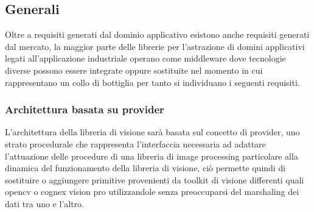 \subsection{Generali}
Oltre a requisiti generati dal dominio applicativo esistono anche requisiti generati dal mercato, la maggior parte delle librerie per l'astrazione di domini applicativi legati all'applicazione industriale operano come middleware dove tecnologie diverse possono essere integrate oppure sostituite nel momento in cui rappresentano un collo di bottiglia per tanto si individuano i seguenti requisiti.

\subsubsection{Architettura basata su provider}
L'architettura della libreria di visione sarà basata sul concetto di provider, uno strato procedurale che rappresenta l'interfaccia necessaria ad adattare l'attuazione delle procedure di una libreria di image processing particolare alla dinamica del funzionamento della libreria di visione, ciò permette quindi di sostituire o aggiungere primitive provenienti da toolkit di visione differenti quali opencv o cognex vision pro utilizzandole senza preoccuparsi del marshaling dei dati tra uno e l'altro.